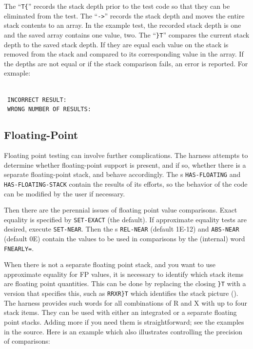 The ``\texttt{T\{}'' records the stack depth prior to the test code
so that they can be eliminated from the test.
The ``\texttt{->}'' records the stack depth and moves the entire stack
contents to an array.  In the example test, the recorded stack depth
is one and the saved array contains one value, two.
The ``\texttt{\}T}'' compares the current stack depth to the saved
stack depth.  If they are equal each value on the stack is removed
from the stack and compared to its corresponding value in the array.
If the depths are not equal or if the stack comparison fails, an error
is reported.  For exmaple:

 \\
\ \texttt{INCORRECT RESULT:}  \\
\   \texttt{WRONG NUMBER OF RESULTS:}  \\

\subsection{Floating-Point}

Floating point testing can involve further complications.  The harness
attempts to determine whether floating-point support is present, and
if so, whether there is a separate floating-point stack, and behave
accordingly.  The s \texttt{HAS-FLOATING} and
\texttt{HAS-FLOATING-STACK} contain the results of its efforts, so
the behavior of the code can be modified by the user if necessary.

Then there are the perennial issues of floating point value
comparisons.  Exact equality is specified by \texttt{SET-EXACT}
(the default).  If approximate equality tests are desired, execute
\texttt{SET-NEAR}.  Then the \linebreak
{}s \texttt{REL-NEAR} (default 1E-12) and
\texttt{ABS-NEAR} (default 0E) contain the values to be used in
comparisons by the (internal) word \texttt{FNEARLY=}.

When there is not a separate floating point stack, and you want to use
approximate equality for FP values, it is necessary to identify which
stack items are floating point quantities.  This can be done by
replacing the closing \texttt{\}T} with a version that specifies
this, such as \texttt{RRXR\}T} which identifies the stack picture
\linebreak ().  The harness provides such words for all
combinations of R and X with up to four stack items.  They can be
used with either an integrated or a separate floating point stacks.
Adding more if you need them is straightforward; see the examples in
the source.  Here is an example which also illustrates controlling
the precision of comparisons:

